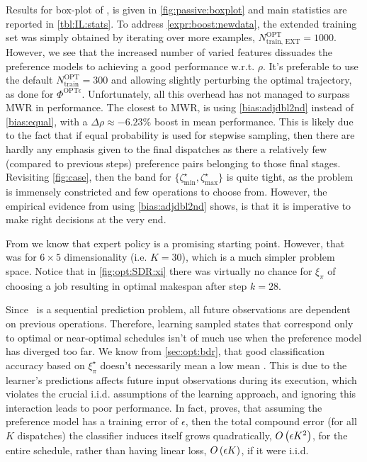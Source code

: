 \documentclass[smallextended]{svjour3}
\begin{document}
Results for  box-plot of \namerho, is given in 
\cref{fig:passive:boxplot} and main statistics are reported in 
\cref{tbl:IL:stats}. 
To address \ref{expr:boost:newdata}, the extended training set was simply 
obtained by iterating over more examples, $N^{\text{OPT}}_{\text{train, 
EXT}}=1000$. However, we see that the increased number of varied features 
dissuades the preference models to achieving a good performance w.r.t. $\rho$. 
It's preferable to use the default $N^{\text{OPT}}_{\text{train}}=300$ and 
allowing slightly perturbing the optimal trajectory, as done for  
$\Phi^{\text{OPT}\epsilon}$. Unfortunately, all this overhead has not managed 
to surpass MWR in performance. 
The closest to MWR, is using \ref{bias:adjdbl2nd} instead of \ref{bias:equal}, 
with a $\Delta\rho\approx-6.23\%$ boost in mean performance. 
This is likely due to the fact that if equal probability is used for stepwise 
sampling, then there are hardly any emphasis given to the final dispatches as 
there a relatively few (compared to previous steps) preference pairs belonging 
to those final stages.
Revisiting \cref{fig:case}, then the band for 
$\{\zeta^{\star}_{\min},\zeta^{\star}_{\max}\}$ is quite tight, as the problem 
is immensely constricted and few operations to choose from. However, the 
empirical evidence from using \ref{bias:adjdbl2nd} shows, is that it is 
imperative to make right decisions at the very end.

From \cite{InRu11a} we know that expert policy is a promising starting point.
However, that was for $6\times5$ dimensionality (i.e. $K=30$), which is a much 
simpler problem space. Notice that in \cref{fig:opt:SDR:xi} there was 
virtually no chance for $\xi_\pi$ of choosing a job resulting in optimal 
makespan after step $k=28$.

Since \jsp\ is a sequential prediction problem, all future observations are 
dependent on previous operations. 
Therefore, learning sampled states that correspond only to optimal or 
near-optimal schedules isn't of much use when the preference model has 
diverged too far. We know from \cref{sec:opt:bdr}, that good classification 
accuracy based on $\xi^\star_\pi$ doesn't necessarily mean a low mean \namerho.
This is due to the learner's predictions affects future input observations 
during its execution, which violates the crucial i.i.d. assumptions of the  
learning approach, and ignoring this interaction leads to poor performance.
In fact, \cite{RossB10} proves, that assuming the preference model has a 
training error of $\epsilon$, then the total compound error (for all $K$ 
dispatches) the classifier induces itself grows quadratically, ${O}\left(\epsilon 
  K^2\right)$, for the entire schedule, rather than having linear loss, 
${O}\left(\epsilon K\right)$, if it were i.i.d.
\end{document}
